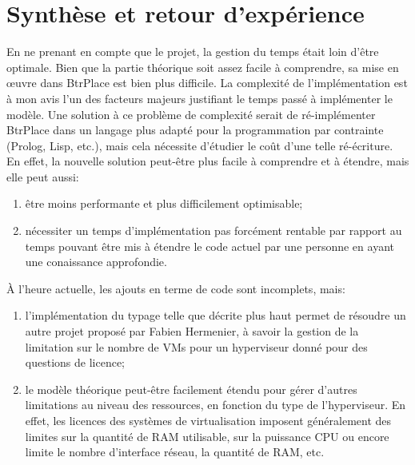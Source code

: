 \documentclass[a4paper]{article}
\begin{document}
\section{Synthèse et retour d'expérience}
En ne prenant en compte que le projet, la gestion du temps était
loin d'être optimale. Bien que la partie théorique soit assez facile
à comprendre, sa mise en œuvre dans BtrPlace est bien plus difficile.
La complexité de l'implémentation est à mon avis l'un des facteurs
majeurs justifiant le temps passé à implémenter le modèle.
Une solution à ce problème de complexité serait de ré-implémenter
BtrPlace dans un langage plus adapté pour la programmation par
contrainte (Prolog, Lisp, etc.), mais cela nécessite d'étudier le
coût d'une telle ré-écriture. En effet, la nouvelle solution peut-être
plus facile à comprendre et à étendre, mais elle peut aussi:
\begin{enumerate}
	\item être moins performante et plus difficilement optimisable;
	\item nécessiter un temps d'implémentation pas forcément rentable
		par rapport au temps pouvant être mis à étendre le code actuel
		par une personne en ayant une conaissance approfondie.
\end{enumerate}

À l'heure actuelle, les ajouts en terme de code sont incomplets, mais:
\begin{enumerate}
	\item l'implémentation du typage telle que décrite plus haut
		permet de résoudre un autre projet proposé par Fabien
		Hermenier, à savoir la gestion de la limitation sur le nombre
		de VMs pour un hyperviseur donné pour des questions de
		licence;
	\item le modèle théorique peut-être facilement étendu pour gérer
		d'autres limitations au niveau des ressources, en fonction
		du type de l'hyperviseur. En effet, les licences des systèmes
		de virtualisation imposent généralement des limites sur la
		quantité de RAM utilisable, sur la puissance CPU ou encore
		limite le nombre d'interface réseau, la quantité de RAM, etc.
\end{enumerate}
\end{document}
